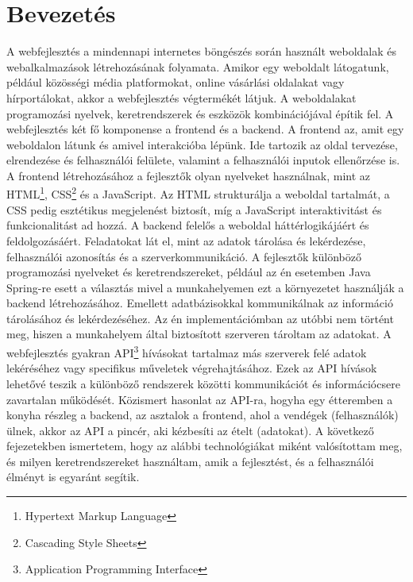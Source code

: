 \documentclass[a4paper,twoside]{article}
\begin{document}
\section{Bevezetés}
A webfejlesztés a mindennapi internetes böngészés során használt weboldalak és
webalkalmazások létrehozásának folyamata. Amikor egy weboldalt látogatunk, például
közösségi média platformokat, online vásárlási oldalakat vagy hírportálokat, akkor a
webfejlesztés végtermékét látjuk.
A weboldalakat programozási nyelvek, keretrendszerek és eszközök kombinációjával építik
fel. A webfejlesztés két fő komponense a frontend és a backend.
A frontend az, amit egy weboldalon látunk és amivel interakcióba lépünk. Ide tartozik az
oldal tervezése, elrendezése és felhasználói felülete, valamint a felhasználói inputok
ellenőrzése is. A frontend létrehozásához a fejlesztők olyan nyelveket használnak, mint az
HTML\footnote{Hypertext Markup Language}, CSS\footnote{Cascading Style Sheets} és a JavaScript. Az
HTML strukturálja a weboldal tartalmát, a CSS pedig esztétikus megjelenést biztosít, míg a
JavaScript interaktivitást és funkcionalitást ad hozzá.
A backend felelős a weboldal háttérlogikájáért és feldolgozásáért. Feladatokat lát el, mint az
adatok tárolása és lekérdezése, felhasználói azonosítás és a szerverkommunikáció. A
fejlesztők különböző programozási nyelveket és keretrendszereket, például az én esetemben
Java Spring\cite{javaspring}-re esett a választás mivel a munkahelyemen ezt a környezetet használják a
backend létrehozásához. Emellett adatbázisokkal kommunikálnak az információ tárolásához
és lekérdezéséhez. Az én implementációmban az utóbbi nem történt meg, hiszen a
munkahelyem által biztosított szerveren tároltam az adatokat.
A webfejlesztés gyakran API\footnote{Application Programming Interface} hívásokat tartalmaz más
szerverek felé adatok lekéréséhez vagy specifikus műveletek végrehajtásához. Ezek az API
hívások lehetővé teszik a különböző rendszerek közötti kommunikációt és információcsere
zavartalan működését. Közismert hasonlat az API-ra, hogyha egy étteremben a konyha
részleg a backend, az asztalok a frontend, ahol a vendégek (felhasználók) ülnek, akkor az API
a pincér, aki kézbesíti az ételt (adatokat).
A következő fejezetekben ismertetem, hogy az alábbi technológiákat miként valósítottam
meg, és milyen keretrendszereket használtam, amik a fejlesztést, és a felhasználói élményt is
egyaránt segítik.
\newpage
\end{document}
